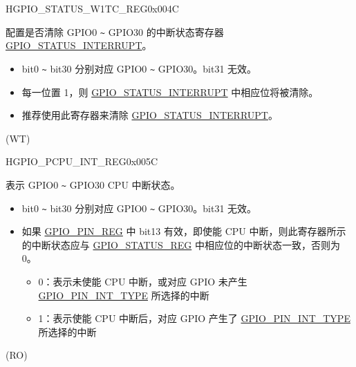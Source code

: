 \begin{register}{H}{GPIO\_STATUS\_W1TC\_REG}{0x004C}\label{regdesc:GPIOSTATUSW1TCREG}
%
\regnewline%
\begin{regdesc}\begin{reglist}
\label{fielddesc:GPIOSTATUSW1TC}\item [GPIO\_STATUS\_W1TC] 配置是否清除 GPIO0 \verb+~+ GPIO30 的中断状态寄存器 \hyperref[fielddesc:GPIOSTATUSINTERRUPT]{GPIO\_STATUS\_INTERRUPT}。
\begin{itemize}
    \item bit0 \verb+~+ bit30 分别对应 GPIO0 \verb+~+ GPIO30。bit31 无效。
    \item 每一位置 1，则 \hyperref[fielddesc:GPIOSTATUSINTERRUPT]{GPIO\_STATUS\_INTERRUPT} 中相应位将被清除。 
    \item 推荐使用此寄存器来清除 \hyperref[fielddesc:GPIOSTATUSINTERRUPT]{GPIO\_STATUS\_INTERRUPT}。 \end{itemize}(WT)
\end{reglist}\end{regdesc}
\end{register}

\begin{register}{H}{GPIO\_PCPU\_INT\_REG}{0x005C}\label{regdesc:GPIOPCPUINTREG}
%
\regnewline%
\begin{regdesc}\begin{reglist}
\label{fielddesc:GPIOPROCPUINT}\item [GPIO\_PROCPU\_INT] 表示 GPIO0 \verb+~+ GPIO30 CPU 中断状态。 
\begin{itemize}
    \item bit0 \verb+~+ bit30 分别对应 GPIO0 \verb+~+ GPIO30。bit31 无效。
    \item 如果 \hyperref[regdesc:GPIOPINNREG]{GPIO\_PIN\_REG} 中 bit13 有效，即使能 CPU 中断，则此寄存器所示的中断状态应与 \hyperref[regdesc:GPIOSTATUSREG]{GPIO\_STATUS\_REG} 中相应位的中断状态一致，否则为 0。
    \begin{itemize}
        \item 0：表示未使能 CPU 中断，或对应 GPIO 未产生 \hyperref[fielddesc:GPIOPINNINTTYPE]{GPIO\_PIN\_INT\_TYPE} 所选择的中断
        \item 1：表示使能 CPU 中断后，对应 GPIO 产生了 \hyperref[fielddesc:GPIOPINNINTTYPE]{GPIO\_PIN\_INT\_TYPE} 所选择的中断
    \end{itemize}
\end{itemize}
(RO)
\end{reglist}\end{regdesc}
\end{register}




